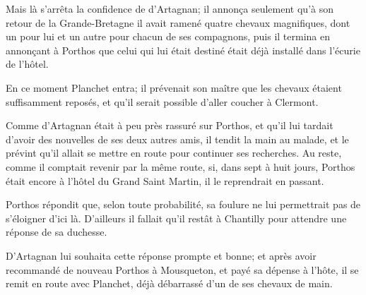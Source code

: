 Mais là s'arrêta la confidence de d'Artagnan; il annonça seulement qu'à son retour de la Grande-Bretagne il avait ramené quatre chevaux magnifiques, dont un pour lui et un autre pour chacun de ses compagnons, puis il termina en annonçant à Porthos que celui qui lui était destiné était déjà installé dans l'écurie de l'hôtel. 

En ce moment Planchet entra; il prévenait son maître que les chevaux étaient suffisamment reposés, et qu'il serait possible d'aller coucher à Clermont. 

Comme d'Artagnan était à peu près rassuré sur Porthos, et qu'il lui tardait d'avoir des nouvelles de ses deux autres amis, il tendit la main au malade, et le prévint qu'il allait se mettre en route pour continuer ses recherches. Au reste, comme il comptait revenir par la même route, si, dans sept à huit jours, Porthos était encore à l'hôtel du Grand Saint Martin, il le reprendrait en passant. 

Porthos répondit que, selon toute probabilité, sa foulure ne lui permettrait pas de s'éloigner d'ici là. D'ailleurs il fallait qu'il restât à Chantilly pour attendre une réponse de sa duchesse. 

D'Artagnan lui souhaita cette réponse prompte et bonne; et après avoir recommandé de nouveau Porthos à Mousqueton, et payé sa dépense à l'hôte, il se remit en route avec Planchet, déjà débarrassé d'un de ses chevaux de main.